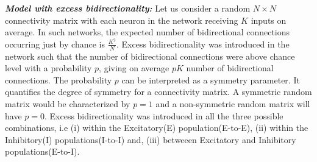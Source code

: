 \emph{\textbf{Model with excess bidirectionality:}} Let us consider a random $N \times N$ connectivity matrix with each neuron in the network receiving $K$ inputs on average. In such networks, the expected number of bidirectional connections occurring just by chance is $\frac{K^2}{N}$. Excess bidirectionality was introduced in the network such that the number of bidirectional connections were above chance level with a probability $p$, giving on average $pK$ number of bidirectional connections. The probability $p$ can be interpreted as a symmetry parameter. It quantifies the degree of symmetry for a connectivity matrix. A symmetric random matrix would be characterized by $p = 1$ and a non-symmetric random matrix will have $p = 0$. %
Excess bidirectionality was introduced in all the three possible combinations, i.e (i) within the Excitatory(E) population(E-to-E), (ii) within the Inhibitory(I) populations(I-to-I) and, (iii) betweeen Excitatory and Inhibitory populations(E-to-I). \\




